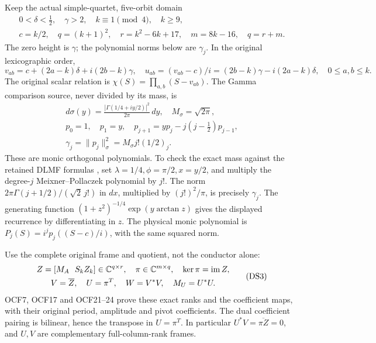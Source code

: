 \documentclass[11pt]{article}
\begin{document}
Keep the actual simple-quartet, five-orbit domain
\[
\begin{gathered}
0<\delta<\tfrac12,\quad \gamma>2,\quad k\equiv1\pmod4,\quad k\geq9,\\
c=k/2,\quad q=(k+1)^2,\quad r=k^2-6k+17,\quad m=8k-16,\quad q=r+m.
\end{gathered}
\]
The zero height is \(\gamma\); the polynomial norms below are
\(\gamma_j\). In the original lexicographic order,
\begin{equation}\label{dsroot:eq:roots}
v_{ab}=c+(2a-k)\delta+i(2b-k)\gamma,
\quad u_{ab}=(v_{ab}-c)/i
=(2b-k)\gamma-i(2a-k)\delta,
\quad 0\leq a,b\leq k.
\tag{DS1}
\end{equation}
The original scalar relation is \(\chi(S)=\prod_{a,b}(S-v_{ab})\).
The Gamma comparison source, never divided by its mass, is
\begin{equation}\label{dsroot:eq:gamma}
\begin{gathered}
d\sigma(y)=\frac{|\Gamma(1/4+iy/2)|^2}{2\pi}\,dy,\quad M_\sigma=\sqrt{2\pi},\\
p_0=1,\quad p_1=y,\quad p_{j+1}=yp_j-j(j-\tfrac12)p_{j-1},\\
\gamma_j=\|p_j\|_\sigma^2=M_\sigma j!(1/2)_j.
\end{gathered}
\tag{DS2}
\end{equation}
These are monic orthogonal polynomials. To check the exact mass against
the retained DLMF formulas \cite[18.19.E8--E9a,18.23.E7]{dsroot:DLMF}, set
\(\lambda=1/4,\phi=\pi/2,x=y/2\), and multiply the degree-\(j\)
Meixner--Pollaczek polynomial by \(j!\). The norm
\(2\pi\Gamma(j+1/2)/(\sqrt2\,j!)\) in \(dx\), multiplied by
\((j!)^2/\pi\), is precisely \(\gamma_j\). The generating function
\((1+z^2)^{-1/4}\exp(y\arctan z)\) gives the displayed recurrence
by differentiating in \(z\). The physical monic polynomial is
\(P_j(S)=i^jp_j((S-c)/i)\), with the same squared norm.

Use the complete original frame and quotient, not the conductor alone:
\begin{equation}\label{dsroot:eq:frames}
\begin{gathered}
Z=[M_A\ \ S_kZ_k]\in\mathbb C^{q\times r},\quad \pi\in\mathbb C^{m\times q},\quad \ker\pi=\operatorname{im}Z,\\
V=\overline Z,\quad U=\pi^T,\quad W=V^*V,\quad M_U=U^*U.
\end{gathered}
\tag{DS3}
\end{equation}
OCF7, OCF17 and OCF21--24 prove these exact ranks and the coefficient
maps, with their original period, amplitude and pivot coefficients.
The dual coefficient pairing is bilinear, hence the transpose in
\(U=\pi^T\). In particular \(U^*V=\overline{\pi Z}=0\), and
\(U,V\) are complementary full-column-rank frames.
\end{document}
